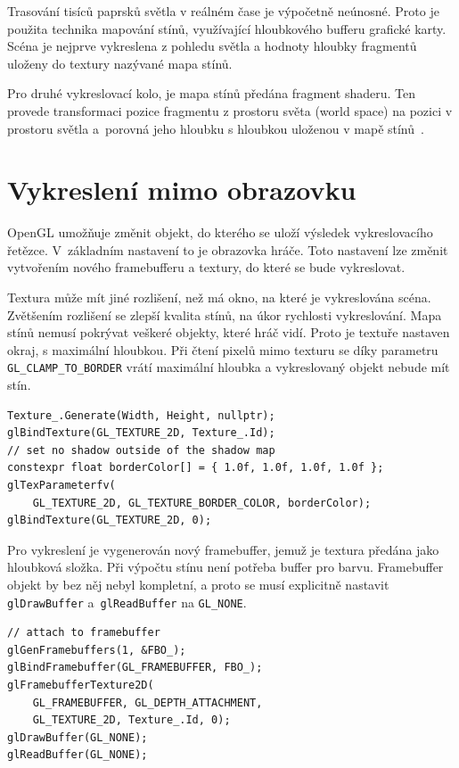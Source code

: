 \documentclass[thesis=M,czech]{FITthesis}[2019/12/23]
\begin{document}
Trasování tisíců paprsků světla v reálném čase je výpočetně neúnosné. Proto je použita technika mapování stínů, využívající hloubkového bufferu grafické karty. Scéna je nejprve vykreslena z pohledu světla a hodnoty hloubky fragmentů uloženy do textury nazývané mapa stínů.

Pro druhé vykreslovací kolo, je mapa stínů předána fragment shaderu. Ten provede transformaci pozice fragmentu z prostoru světa (world space) na pozici v prostoru světla a~porovná jeho hloubku s hloubkou uloženou v mapě stínů~\cite{lopgl_shadows}.

\section{Vykreslení mimo obrazovku}

OpenGL umožňuje změnit objekt, do kterého se uloží výsledek vykreslovacího řetězce. V~základním nastavení to je obrazovka hráče. Toto nastavení lze změnit vytvořením nového framebufferu a textury, do které se bude vykreslovat.

Textura může mít jiné rozlišení, než má okno, na které je vykreslována scéna. Zvětšením rozlišení se zlepší kvalita stínů, na úkor rychlosti vykreslování. Mapa stínů nemusí pokrývat veškeré objekty, které hráč vidí. Proto je textuře nastaven okraj, s maximální hloubkou. Při čtení pixelů mimo texturu se díky parametru \texttt{GL\_CLAMP\_TO\_BORDER} vrátí maximální hloubka a vykreslovaný objekt nebude mít stín.

\begin{verbatim}
Texture_.Generate(Width, Height, nullptr);
glBindTexture(GL_TEXTURE_2D, Texture_.Id);
// set no shadow outside of the shadow map
constexpr float borderColor[] = { 1.0f, 1.0f, 1.0f, 1.0f };
glTexParameterfv(
    GL_TEXTURE_2D, GL_TEXTURE_BORDER_COLOR, borderColor);
glBindTexture(GL_TEXTURE_2D, 0);
\end{verbatim}

Pro vykreslení je vygenerován nový framebuffer, jemuž je textura předána jako hloubková složka. Při výpočtu stínu není potřeba buffer pro barvu. Framebuffer objekt by bez něj nebyl kompletní, a proto se musí explicitně nastavit \texttt{glDrawBuffer} a~\texttt{glReadBuffer} na \texttt{GL\_NONE}. 

\begin{verbatim}
// attach to framebuffer
glGenFramebuffers(1, &FBO_);
glBindFramebuffer(GL_FRAMEBUFFER, FBO_);
glFramebufferTexture2D(
    GL_FRAMEBUFFER, GL_DEPTH_ATTACHMENT,
    GL_TEXTURE_2D, Texture_.Id, 0);
glDrawBuffer(GL_NONE);
glReadBuffer(GL_NONE);
\end{verbatim}
\end{document}
